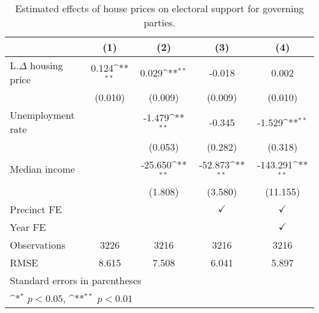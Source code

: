 \begin{table}[htbp]\centering
\def\sym#1{\ifmmode^{#1}\else\(^{#1}\)\fi}
\caption{Estimated effects of house prices on electoral support for governing parties.} \label{prelagiv}
\begin{tabular}{l*{4}{c}}
\hline\hline
                    &\multicolumn{1}{c}{(1)}        &\multicolumn{1}{c}{(2)}        &\multicolumn{1}{c}{(3)}        &\multicolumn{1}{c}{(4)}        \\
\hline
L.$\Delta$ housing price&       0.124\sym{**}&       0.029\sym{**}&      -0.018        &       0.002        \\
                    &     (0.010)        &     (0.009)        &     (0.009)        &     (0.010)        \\
[1em]
Unemployment rate   &                    &      -1.479\sym{**}&      -0.345        &      -1.529\sym{**}\\
                    &                    &     (0.053)        &     (0.282)        &     (0.318)        \\
[1em]
Median income       &                    &     -25.650\sym{**}&     -52.873\sym{**}&    -143.291\sym{**}\\
                    &                    &     (1.808)        &     (3.580)        &    (11.155)        \\
[1em]
\hline Precinct FE  &                    &                    &$\checkmark$        &$\checkmark$        \\
[1em]
Year FE             &                    &                    &                    &$\checkmark$        \\
\hline
Observations        &        3226        &        3216        &        3216        &        3216        \\
RMSE                &       8.615        &       7.508        &       6.041        &       5.897        \\
\hline\hline
\multicolumn{5}{l}{\footnotesize Standard errors in parentheses}\\
\multicolumn{5}{l}{\footnotesize \sym{*} \(p<0.05\), \sym{**} \(p<0.01\)}\\
\end{tabular}
\end{table}
